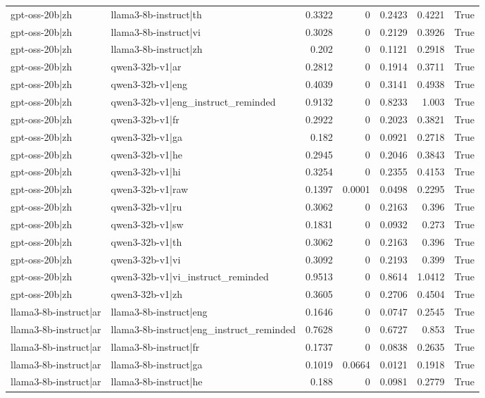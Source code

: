 \begin{table}
\begin{tabular}{l l r r r r l}
gpt-oss-20b|zh & llama3-8b-instruct|th & 0.3322 & 0 & 0.2423 & 0.4221 & True \\
gpt-oss-20b|zh & llama3-8b-instruct|vi & 0.3028 & 0 & 0.2129 & 0.3926 & True \\
gpt-oss-20b|zh & llama3-8b-instruct|zh & 0.202 & 0 & 0.1121 & 0.2918 & True \\
gpt-oss-20b|zh & qwen3-32b-v1|ar & 0.2812 & 0 & 0.1914 & 0.3711 & True \\
gpt-oss-20b|zh & qwen3-32b-v1|eng & 0.4039 & 0 & 0.3141 & 0.4938 & True \\
gpt-oss-20b|zh & qwen3-32b-v1|eng_instruct_reminded & 0.9132 & 0 & 0.8233 & 1.003 & True \\
gpt-oss-20b|zh & qwen3-32b-v1|fr & 0.2922 & 0 & 0.2023 & 0.3821 & True \\
gpt-oss-20b|zh & qwen3-32b-v1|ga & 0.182 & 0 & 0.0921 & 0.2718 & True \\
gpt-oss-20b|zh & qwen3-32b-v1|he & 0.2945 & 0 & 0.2046 & 0.3843 & True \\
gpt-oss-20b|zh & qwen3-32b-v1|hi & 0.3254 & 0 & 0.2355 & 0.4153 & True \\
gpt-oss-20b|zh & qwen3-32b-v1|raw & 0.1397 & 0.0001 & 0.0498 & 0.2295 & True \\
gpt-oss-20b|zh & qwen3-32b-v1|ru & 0.3062 & 0 & 0.2163 & 0.396 & True \\
gpt-oss-20b|zh & qwen3-32b-v1|sw & 0.1831 & 0 & 0.0932 & 0.273 & True \\
gpt-oss-20b|zh & qwen3-32b-v1|th & 0.3062 & 0 & 0.2163 & 0.396 & True \\
gpt-oss-20b|zh & qwen3-32b-v1|vi & 0.3092 & 0 & 0.2193 & 0.399 & True \\
gpt-oss-20b|zh & qwen3-32b-v1|vi_instruct_reminded & 0.9513 & 0 & 0.8614 & 1.0412 & True \\
gpt-oss-20b|zh & qwen3-32b-v1|zh & 0.3605 & 0 & 0.2706 & 0.4504 & True \\
llama3-8b-instruct|ar & llama3-8b-instruct|eng & 0.1646 & 0 & 0.0747 & 0.2545 & True \\
llama3-8b-instruct|ar & llama3-8b-instruct|eng_instruct_reminded & 0.7628 & 0 & 0.6727 & 0.853 & True \\
llama3-8b-instruct|ar & llama3-8b-instruct|fr & 0.1737 & 0 & 0.0838 & 0.2635 & True \\
llama3-8b-instruct|ar & llama3-8b-instruct|ga & 0.1019 & 0.0664 & 0.0121 & 0.1918 & True \\
llama3-8b-instruct|ar & llama3-8b-instruct|he & 0.188 & 0 & 0.0981 & 0.2779 & True \\

\end{tabular}
\end{table}
